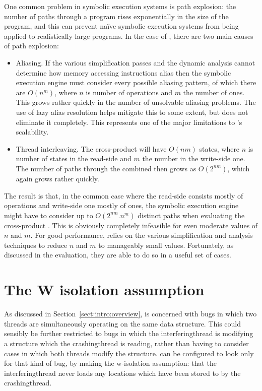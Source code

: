 {One common problem in symbolic execution systems is path explosion:
the number of paths through a program rises exponentially in the size
of the program, and this can prevent na\"ive symbolic execution
systems from being applied to realistically large programs.  In the
case of \technique, there are two main causes of path explosion:

\begin{itemize}
\item
  Aliasing.  If the various simplification passes and the dynamic
  analysis cannot determine how memory accessing instructions alias
  then the symbolic execution engine must consider every possible
  aliasing pattern, of which there are $O(n^m)$, where $n$ is number
  of  operations and $m$ the number of  ones.
  This grows rather quickly in the number of unsolvable aliasing
  problems.  The use of lazy alias resolution helps mitigate this to
  some extent, but does not eliminate it completely.  This represents
  one of the major limitations to \technique's scalability.
\item
  Thread interleaving.  The cross-product {\StateMachine} will have
  $O(nm)$ states, where $n$ is number of states in the read-side
  {\StateMachine} and $m$ the number in the write-side one.  The
  number of paths through the combined {\StateMachine} then grows as
  $O(2^{nm})$, which again grows rather quickly.
\end{itemize}

The result is that, in the common case where the read-side
{\StateMachine} consists mostly of  operations and
write-side one mostly of  ones, the symbolic execution
engine might have to consider up to $O(2^{nm}.n^m)$ distinct paths when
evaluating the cross-product {\StateMachine}.  This is obviously
completely infeasible for even moderate values of $n$ and $m$.  For
good performance, {\technique} relies on the various simplification
and analysis techniques to reduce $n$ and $m$ to manageably small
values.  Fortunately, as discussed in the evaluation, they are able to
do so in a useful set of cases.

\section{The W isolation assumption}
\label{sect:derive:w_isolation}


As discussed in Section~\ref{sect:intro:overview}, {\technique} is
concerned with bugs in which two threads are simultaneously operating
on the same data structure.  This could sensibly be further restricted
to bugs in which the \gls{interferingthread} is modifying a structure
which the \gls{crashingthread} is reading, rather than having to
consider cases in which both threads modify the structure.
{\Implementation} can be configured to look only for that kind of bug,
by making the \gls{w-isolation} assumption: that the
\gls{interferingthread} never loads any locations which have been
stored to by the \gls{crashingthread}.

}
